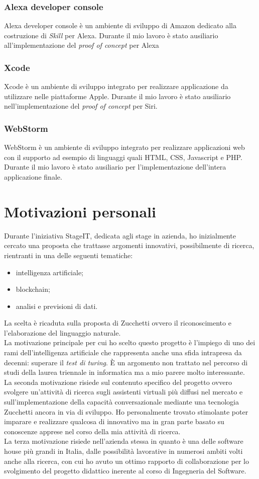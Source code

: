 		\subsubsection{Alexa developer console}
		Alexa developer console è un ambiente di sviluppo di Amazon dedicato alla costruzione di \textit{Skill} per Alexa. Durante il mio lavoro è stato ausiliario all'implementazione del \textit{proof of concept} per Alexa
		\subsubsection{Xcode}
		Xcode è un ambiente di sviluppo integrato per realizzare applicazione da utilizzare nelle piattaforme Apple. Durante il mio lavoro è stato ausiliario nell'implementazione del \textit{proof of concept} per Siri.
		\subsubsection{WebStorm}
		WebStorm è un ambiente di sviluppo integrato per realizzare applicazioni web con il supporto ad esempio di linguaggi quali HTML, CSS, Javascript e PHP. Durante il mio lavoro è stato ausiliario per l'implementazione dell'intera applicazione finale.

\section{Motivazioni personali}
Durante l'iniziativa StageIT, dedicata agli stage in azienda, ho inizialmente cercato una proposta che trattasse argomenti innovativi, possibilmente di ricerca, rientranti in una delle seguenti tematiche:
\begin{itemize}
	\item intelligenza artificiale;
	\item blockchain;
	\item analisi e previsioni di dati.
\end{itemize}
La scelta è ricaduta sulla proposta di Zucchetti ovvero il riconoscimento e l'elaborazione del linguaggio naturale. \\
La motivazione principale per cui ho scelto questo progetto è l'impiego di uno dei rami dell'intelligenza artificiale che rappresenta anche una sfida intrapresa da decenni: superare il \emph{test di turing}\glsfirstoccur. È un argomento non trattato nel percorso di studi della laurea triennale in informatica ma a mio parere molto interessante. \\
La seconda motivazione risiede sul contenuto specifico del progetto ovvero svolgere un'attività di ricerca sugli assistenti virtuali più diffusi nel mercato e sull'implementazione della capacità conversazionale mediante una tecnologia Zucchetti ancora in via di sviluppo. Ho personalmente trovato stimolante poter imparare e realizzare qualcosa di innovativo ma in gran parte basato su conoscenze apprese nel corso della mia attività di ricerca. \\
La terza motivazione risiede nell'azienda stessa in quanto è una delle software house più grandi in Italia, dalle possibilità lavorative in numerosi ambiti volti anche alla ricerca, con cui ho avuto un ottimo rapporto di collaborazione per lo svolgimento del progetto didattico inerente al corso di Ingegneria del Software.